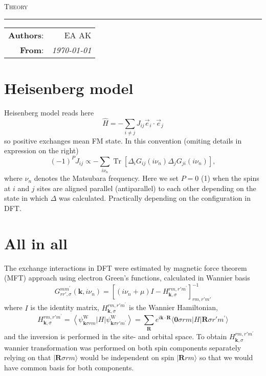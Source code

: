 \documentclass[12pt,a4paper]{article}
\begin{document}
\begin{center}
    \LARGE \textsc{Theory}
\end{center}

\hrule

\phantom{42}

\begin{flushright}
    \begin{tabular}{rr}
        \textbf{Authors}: 
        & EA AK\\
        \textbf{From}: &
        \textit{\today}\\
    \end{tabular}
\end{flushright}

\thispagestyle{empty}

\section{Heisenberg model}
Heisenberg model reads here
\[
    \hat{H}=-\sum_{i \neq j} J_{i j} \vec{e}_i \cdot \vec{e}_j
\]
so positive exchanges mean FM state. 
In this convention (omiting details in expression on the right)
$$
(-1)^P J_{i j} \propto - \sum_{i \nu_n} \operatorname{Tr}\left[ \Delta_i G_{i j}\left(i \nu_n\right) \Delta_j G_{j i}\left(i \nu_n\right) \right],
$$
where $\nu_n$ denotes the Matsubara frequency. 
Here we set $P=0$ (1) when the spins at $i$ and $j$ sites are aligned parallel (antiparallel) to each other depending on the state in which $\Delta$ was calculated. 
Practically depending on the configuration in DFT.

\section{All in all}
The exchange interactions in DFT were estimated by magnetic force theorem (MFT)  approach \cite{korotin_calculation_2015,liechtenstein_local_1987} using electron Green's functions, 
calculated in Wannier basis 
\begin{equation}
    G_{rr', \sigma}^{m m^{\prime}}(\mathbf{k},i \nu_n)=\left[(i \nu_n + \mu)I-H^{rm, r'm^{\prime}}_{\mathbf{k},\sigma}\right]_{rm,r'm'}^{-1}
\end{equation} 
where $I$ is the identity matrix,
 $H^{rm, r'm^{\prime}}_{\mathbf{k},\sigma}$ is the Wannier Hamiltonian, 
\[
    H^{rm, r'm^{\prime}}_{\mathbf{k},\sigma} =\left\langle\psi_{\mathbf{k} \sigma rm}^{\mathrm{W}}|H| \psi_{\mathbf{k} \sigma r'm^{\prime}}^{\mathrm{W}}\right\rangle=
    \sum_{\mathbf{R}} e^{i \mathbf{k} \cdot \mathbf{R}}\langle\mathbf{0} \sigma rm |H| \mathbf{R} \sigma r'm^{\prime}\rangle
\]
and the inversion is performed in the site- and orbital space. 
To obtain $H^{rm, r'm^{\prime}}_{\mathbf{k},\sigma}$ wannier transformation was performed on both spin components separately 
relying on that $| \mathbf{R} \sigma rm\rangle $ would be independent on spin $| \mathbf{R} rm\rangle$ so that we would have common basis for both components. 
\end{document}

